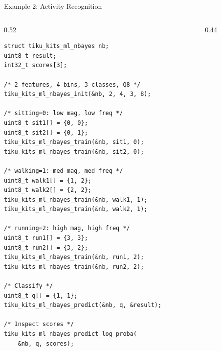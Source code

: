 \documentclass[aspectratio=169, 10pt]{beamer}
\begin{document}
\begin{frame}[fragile]{Example 2: Activity Recognition}
\begin{columns}[T]
\begin{column}{0.52\textwidth}
\begin{lstlisting}[style=cstyle,
  title={2-feature: magnitude + frequency}]
struct tiku_kits_ml_nbayes nb;
uint8_t result;
int32_t scores[3];

/* 2 features, 4 bins, 3 classes, Q8 */
tiku_kits_ml_nbayes_init(&nb, 2, 4, 3, 8);

/* sitting=0: low mag, low freq */
uint8_t sit1[] = {0, 0};
uint8_t sit2[] = {0, 1};
tiku_kits_ml_nbayes_train(&nb, sit1, 0);
tiku_kits_ml_nbayes_train(&nb, sit2, 0);

/* walking=1: med mag, med freq */
uint8_t walk1[] = {1, 2};
uint8_t walk2[] = {2, 2};
tiku_kits_ml_nbayes_train(&nb, walk1, 1);
tiku_kits_ml_nbayes_train(&nb, walk2, 1);

/* running=2: high mag, high freq */
uint8_t run1[] = {3, 3};
uint8_t run2[] = {3, 2};
tiku_kits_ml_nbayes_train(&nb, run1, 2);
tiku_kits_ml_nbayes_train(&nb, run2, 2);

/* Classify */
uint8_t q[] = {1, 1};
tiku_kits_ml_nbayes_predict(&nb, q, &result);

/* Inspect scores */
tiku_kits_ml_nbayes_predict_log_proba(
    &nb, q, scores);
\end{lstlisting}
\end{column}

\begin{column}{0.44\textwidth}
\begin{center}
\end{center}
\end{column}
\end{columns}
\end{frame}
\end{document}

